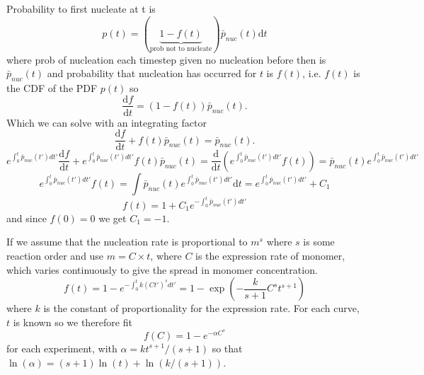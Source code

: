 Probability to first nucleate at t is
\begin{equation}
    p(t) = (\underbrace{1-f(t)}_{\text{prob not to nucleate}})\bar{p}_{nuc}(t)\text{d}t
\end{equation}
where prob of nucleation each timestep given no nucleation before then is $\bar{p}_{nuc}(t)$ and probability that nucleation has occurred for $t$ is $f(t)$, i.e. $f(t)$ is the CDF of the PDF $p(t)$ so
\begin{equation}
    \frac{\text{d}f}{\text{d}t} = (1-f(t))\bar{p}_{nuc}(t).
\end{equation}
Which we can solve with an integrating factor
\begin{equation}
    \frac{\text{d}f}{\text{d}t} + f(t)\bar{p}_{nuc}(t) = \bar{p}_{nuc}(t).
\end{equation}
\begin{equation}
    e^{\int^{t}_{0} \bar{p}_{nuc}(t') dt'}\frac{\text{d}f}{\text{d}t} + e^{\int^{t}_{0} \bar{p}_{nuc}(t') dt'}f(t)\bar{p}_{nuc}(t) = \frac{\text{d}}{\text{d}t}\left(e^{\int^{t}_{0} \bar{p}_{nuc}(t') dt'}f(t)\right) = \bar{p}_{nuc}(t)e^{\int^{t}_{0} \bar{p}_{nuc}(t') dt'}
\end{equation}
\begin{equation}
    e^{\int^{t}_{0} \bar{p}_{nuc}(t') dt'}f(t) = \int\bar{p}_{nuc}(t)e^{\int^{t}_{0} \bar{p}_{nuc}(t') dt'}\text{d}t = e^{\int^{t}_{0} \bar{p}_{nuc}(t') dt'} + C_1
\end{equation}
\begin{equation}
    f(t) = 1 + C_1 e^{-\int^{t}_{0} \bar{p}_{nuc}(t') dt'}
\end{equation}
and since $f(0)=0$ we get $C_1 = -1$.

If we assume that the nucleation rate is proportional to $m^s$ where $s$ is some reaction order and use $m=C\times t$, where $C$ is the expression rate of monomer, which varies continuously to give the spread in monomer concentration.
\begin{equation}
    f(t) = 1 - e^{-\int^{t}_{0} k(C t')^{s} dt'} = 1 - \exp\left(-\frac{k}{s+1}C^{s}t^{s+1}\right)
\end{equation}
where $k$ is the constant of proportionality for the expression rate. For each curve, $t$ is known so we therefore fit
\begin{equation}
    f(C) = 1 - e^{-\alpha C^s}
\end{equation}
for each experiment, with $\alpha=kt^{s+1}/(s+1)$ so that $\ln(\alpha)=(s+1)\ln(t) + \ln(k/(s+1))$.
